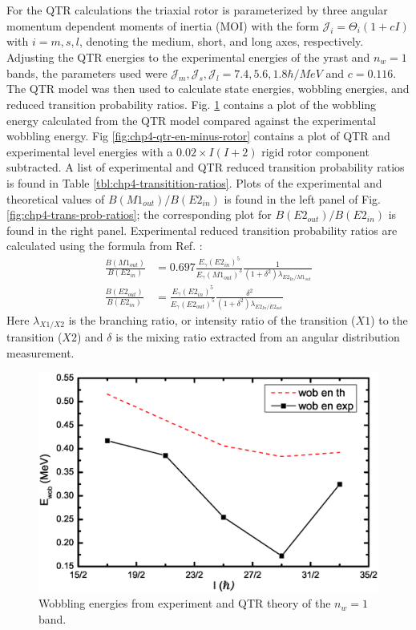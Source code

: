 For the QTR calculations the triaxial rotor is parameterized by three angular momentum dependent moments of inertia (MOI) with the form $\mathcal{J}_i=\Theta_i(1+cI)$ with $i=m,s,l$, denoting the medium, short, and long axes, respectively. Adjusting the QTR energies to the experimental energies of the yrast and $n_w=1$ bands, the parameters used were $\mathcal{J}_m,\mathcal{J}_s,\mathcal{J}_l = 7.4, 5.6, 1.8 \hbar{}/MeV$ and $c=0.116$. The QTR model was then used to calculate state energies, wobbling energies, and reduced transition probability ratios. Fig. \ref{fig:chp4-wobb-en} contains a plot of the wobbling energy calculated from the QTR model compared against the experimental wobbling energy. Fig \ref{fig:chp4-qtr-en-minus-rotor} contains a plot of QTR and experimental level energies with a $0.02\times{}I(I+2)$ rigid rotor component subtracted. A list of experimental and QTR reduced transition probability ratios is found in Table \ref{tbl:chp4-transitition-ratios}. Plots of the experimental and theoretical values of $B(M1_{out})/B(E2_{in})$ is found in the left panel of Fig. \ref{fig:chp4-trans-prob-ratios}; the corresponding plot for $B(E2_{out})/B(E2_{in})$ is found in the right panel. Experimental reduced transition probability ratios are calculated using the formula from Ref. \cite{exoticNuclearExcitations}:
\begin{align}
\label{eqn:chp4-red-trans-prob-ratios}
\frac{B(M1_{out})}{B(E2_{in})} &= 0.697 \frac{E_{\gamma}(E2_{in})^5}{E_{\gamma}(M1_{out})^3}\frac{1}{(1+\delta^2)\lambda{}_{E2_{In}/M1_{out}}}\\
\frac{B(E2_{out})}{B(E2_{in})} &= \frac{E_{\gamma}(E2_{in})^5}{E_{\gamma}(E2_{out})^5}\frac{\delta^2}{(1+\delta^2)\lambda{}_{E2_{In}/E2_{out}}}
\end{align}
Here $\lambda{}_{X1/X2}$ is the branching ratio, or intensity ratio of the transition ($X1$) to the transition ($X2$) and $\delta$ is the mixing ratio extracted from an angular distribution measurement.

\begin{figure}[t!]
\centerline{\includegraphics[width=\textwidth]{./img/c4/wob_en.eps}}
	\caption{Wobbling energies from experiment and QTR theory of the $n_w=1$ band.\label{fig:chp4-wobb-en}}
\end{figure}

